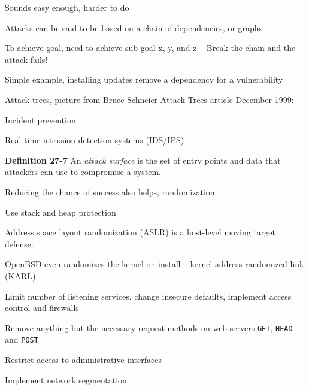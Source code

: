 \documentclass[Screen16to9,17pt]{foils}
\begin{document}
Sounds easy enough, harder to do




\begin{list2}
\item Attacks can be said to be based on a chain of dependencies, or graphs
\item To achieve goal, need to achieve sub goal x, y, and z -- Break the chain and the attack fails!
\item Simple example, installing updates remove a dependency for a vulnerability
\item Attack trees, picture from Bruce Schneier Attack Trees article December 1999:\\ {\footnotesize{}}
\end{list2}




\begin{list2}
\item Incident prevention
\item Real-time intrusion detection systems (IDS/IPS)
\item {\bf Definition 27-7} An \emph{attack surface} is the set of entry points and data that attackers can use to compromise a system.
\item Reducing the chance of success also helps, randomization
\item Use stack and heap protection
\item Address space layout randomization (ASLR) is a host-level moving target defense.
\item OpenBSD even randomizes the kernel on install -- kernel address randomized link (KARL)
\item Limit number of listening services, change insecure defaults, implement access control and firewalls
\item Remove anything but the necessary request methods on web servers \verb+GET+, \verb+HEAD+ and \verb+POST+
\item Restrict access to administrative interfaces
\item Implement network segmentation
\end{list2}



\end{document}
